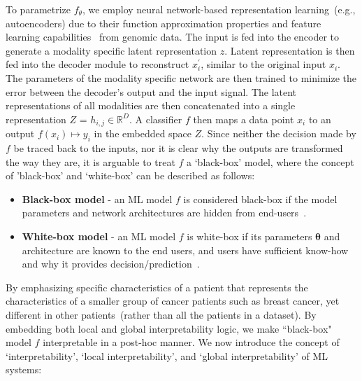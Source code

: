 \hspace*{3.5mm} To parametrize $f_{\theta}$, we employ neural network-based representation learning~(e.g., autoencoders) due to their function approximation properties and feature learning capabilities~\cite{xie2016unsupervised} from genomic data. The input is fed into the encoder %
to generate a modality specific latent representation $z$. Latent representation is then fed into the decoder module to reconstruct ${x}_{i}^{\prime}$, similar to the original input $x_i$. The parameters of the modality specific network are then trained to minimize the error between the decoder’s output and the input signal. The latent representations of all modalities are then concatenated into a single representation $Z$ = $h_{i,j} \in \mathbb{R}^{D}$. A classifier $f$ then maps a data point $x_i$ to an output $f(x_i) \mapsto y_i$ in the embedded space $Z$. Since neither the decision made by $f$ be traced back to the inputs, nor it is clear why the outputs are transformed the way they are, it is arguable to treat $f$ a `black-box' model, where the concept of 'black-box' and `white-box' can be described as follows:   

\begin{itemize}[noitemsep]
    \item \textbf{Black-box model} - an ML model $f$ is considered black-box if the model parameters and network architectures are hidden from  end-users~\cite{das2020opportunities}. 
    \item \textbf{White-box model} - an ML model $f$ is white-box if its parameters $\boldsymbol{\theta}$ and architecture are known to the end users, and users have sufficient know-how and why it provides decision/prediction~\cite{das2020opportunities}.  
\end{itemize}

\hspace*{3.5mm} By emphasizing specific characteristics of a patient that represents the characteristics of a smaller group of cancer patients such as breast cancer, yet different in other patients~(rather than all the patients in a dataset). By embedding both local and global interpretability logic, we make ``black-box" model $f$ interpretable in a post-hoc manner. We now introduce the concept of `interpretability', `local interpretability', and `global interpretability' of ML systems: 

